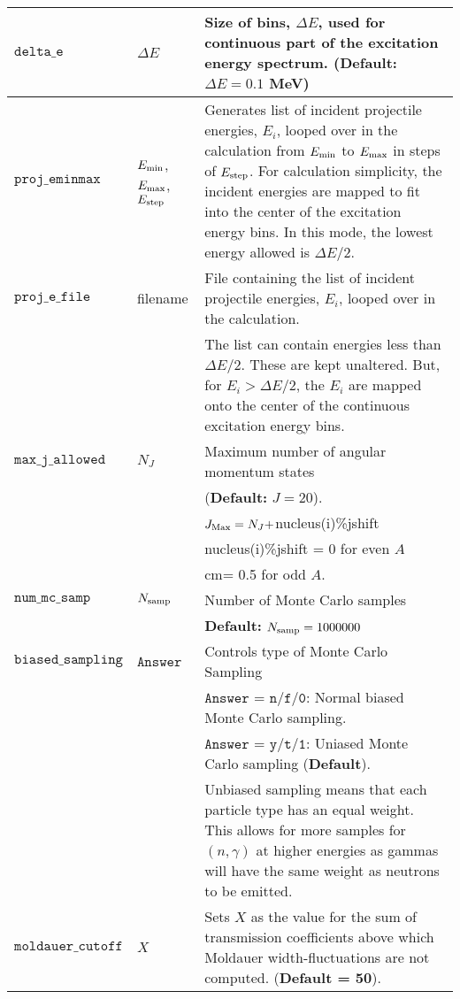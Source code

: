 \documentclass[
10pt,
showpacs,preprintnumbers,footinbib,
amsfonts,amsmath,amssymb,
aps,
prc,twocolumn,groupedaddress,superscriptaddress,
showkeys,
nofootinbib
]{revtex4-1}
\begin{document}
\begin{center}
\begin{tabular}{| p{4cm} | p{4 cm} | p{9 cm} |}
\hline
${\texttt{delta\_e}}$ &  $\Delta E$ &    Size of bins, $\Delta E$, used for continuous part of the excitation energy spectrum. ({\bf Default:} $\Delta E = 0.1$  MeV) \\
\hline
${\texttt{proj\_eminmax}}$  & $E_{\rm min}$, $E_{\rm max}$, $E_{\rm step}$ &
    Generates list of incident projectile energies, $E_i$, looped over in the 
    calculation from $E_{\rm min}$ to $E_{\rm max}$ in steps of $E_{\rm step}$. For calculation 
    simplicity, the incident energies are mapped 
    to fit into the center of the excitation energy bins. In this mode, the 
    lowest energy allowed is $\Delta E/2$. \\
 \hline
${\texttt{proj\_e\_file}}$  & filename &
       File containing the list of incident projectile energies, $E_i$, looped over
       in the calculation. \\
& & The list can contain energies less than $\Delta E/2$.
      These are kept unaltered. But, for $E_i > \Delta E/2$, the $E_i$ are 
      mapped onto the center of the continuous excitation energy bins.\\
\hline
${\texttt{max\_j\_allowed}}$ & $N_J$ &  Maximum number of angular momentum states \\
 & & ({\bf Default:} $J=20$).\\
  &  &   $J_{\rm Max} = N_J + $nucleus(i)\%jshift  \\
  &  &  nucleus(i)\%jshift = 0 for even $A$ \\
  &  &  \hskip 2.7 cm= 0.5 for odd $A$. \\
\hline
${\texttt{num\_mc\_samp }}$ & $N_{\rm samp}$ &    Number of Monte Carlo samples \\
 &  &  {\bf Default:} $N_{\rm samp} = 1000000$\\
\hline
${\texttt{biased\_sampling}}$ & ${\texttt{Answer}}$  & Controls type of Monte Carlo Sampling \\
& & ${\texttt{Answer}}$ = ${\texttt{n/f/0}}$: Normal biased Monte Carlo sampling.\\  
& & ${\texttt{Answer}}$ = ${\texttt{y/t/1}}$: Uniased Monte Carlo sampling ({\bf Default}).\\
& & Unbiased sampling means that each particle type has an equal weight. This allows for more samples for $(n,\gamma)$ at higher energies as gammas will have the same weight as neutrons to be emitted.\\
\hline
${\texttt{moldauer\_cutoff}}$ & $X$  & Sets $X$ as the value for the sum of transmission coefficients above which Moldauer width-fluctuations are not computed. ({\bf Default = 50}). \\
\hline
\end{tabular}
\end{center}
\end{document}
